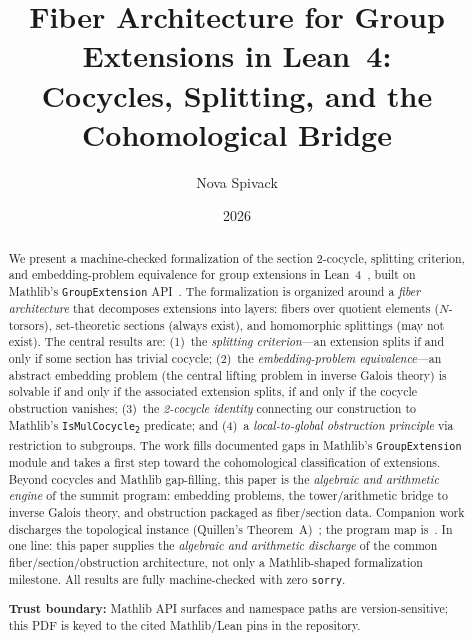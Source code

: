 \documentclass[11pt]{article}
\title{Fiber Architecture for Group Extensions in Lean~4:\\[0.35em]
\large Cocycles, Splitting, and the Cohomological Bridge}
\author{Nova Spivack}
\date{2026}
\newcommand{\lean}[1]{\texttt{#1}}
\newcommand{\IsMulCocycle}{\lean{IsMulCocycle\textsubscript{2}}}
\begin{document}
\maketitle
\NovaZenodoAfterTitle


\begin{abstract}
\raggedright
We present a machine-checked formalization of the section 2-cocycle, splitting
criterion, and embedding-problem equivalence for group extensions in
Lean~4~\cite{Lean4}, built on Mathlib's \lean{GroupExtension}
API~\cite{Mathlib,Yamazaki2024}. The formalization is organized around a
\emph{fiber architecture} that decomposes extensions into layers: fibers over
quotient elements ($N$-torsors), set-theoretic sections (always exist), and
homomorphic splittings (may not exist). The central results are: (1)~the
\emph{splitting criterion}---an extension splits if and only if some section has
trivial cocycle; (2)~the \emph{embedding-problem equivalence}---an abstract
embedding problem (the central lifting problem in inverse Galois theory) is
solvable if and only if the associated extension splits, if and only if the
cocycle obstruction vanishes; (3)~the \emph{2-cocycle identity} connecting our
construction to Mathlib's \IsMulCocycle{} predicate; and (4)~a
\emph{local-to-global obstruction principle} via restriction to subgroups. The
work fills documented gaps in Mathlib's \lean{GroupExtension} module and takes a
first step toward the cohomological classification of extensions. Beyond
cocycles and Mathlib gap-filling, this paper is the \emph{algebraic and arithmetic
engine} of the summit program: embedding problems, the tower/arithmetic bridge to
inverse Galois theory, and obstruction packaged as fiber/section data. Companion
work discharges the topological instance (Quillen's Theorem~A)~\cite{SpivackQuillen};
the program map is~\cite{SpivackSynthesis}. In one line: this paper supplies the
\emph{algebraic and arithmetic discharge} of the common fiber/section/obstruction architecture,
not only a Mathlib-shaped formalization milestone. All results are fully machine-checked with zero \lean{sorry}.

\textbf{Trust boundary:} Mathlib API surfaces and namespace paths are version-sensitive; this PDF is keyed to the cited Mathlib/Lean pins in the repository.
\end{abstract}


\end{document}
